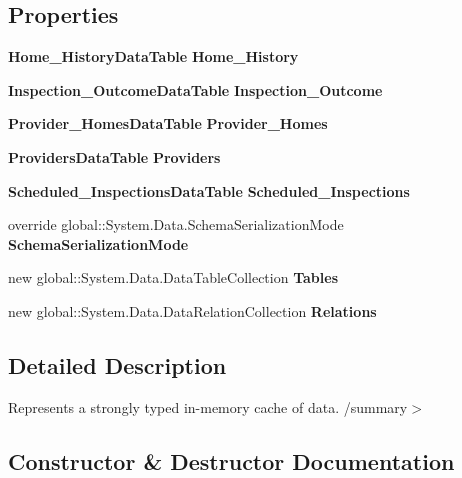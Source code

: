 \subsection*{Properties}
\begin{DoxyCompactItemize}
\item 
\textbf{ Home\+\_\+\+History\+Data\+Table} \textbf{ Home\+\_\+\+History}\hspace{0.3cm}{\ttfamily  [get]}
\item 
\textbf{ Inspection\+\_\+\+Outcome\+Data\+Table} \textbf{ Inspection\+\_\+\+Outcome}\hspace{0.3cm}{\ttfamily  [get]}
\item 
\textbf{ Provider\+\_\+\+Homes\+Data\+Table} \textbf{ Provider\+\_\+\+Homes}\hspace{0.3cm}{\ttfamily  [get]}
\item 
\textbf{ Providers\+Data\+Table} \textbf{ Providers}\hspace{0.3cm}{\ttfamily  [get]}
\item 
\textbf{ Scheduled\+\_\+\+Inspections\+Data\+Table} \textbf{ Scheduled\+\_\+\+Inspections}\hspace{0.3cm}{\ttfamily  [get]}
\item 
override global\+::\+System.\+Data.\+Schema\+Serialization\+Mode \textbf{ Schema\+Serialization\+Mode}\hspace{0.3cm}{\ttfamily  [get, set]}
\item 
new global\+::\+System.\+Data.\+Data\+Table\+Collection \textbf{ Tables}\hspace{0.3cm}{\ttfamily  [get]}
\item 
new global\+::\+System.\+Data.\+Data\+Relation\+Collection \textbf{ Relations}\hspace{0.3cm}{\ttfamily  [get]}
\end{DoxyCompactItemize}


\subsection{Detailed Description}
Represents a strongly typed in-\/memory cache of data. /summary$>$ 

\subsection{Constructor \& Destructor Documentation}
\mbox{\label{class_a_f_h___scheduler_1_1_home_inspection_data_set_ac94fe8f824270954afeeaf9958360814}} 
